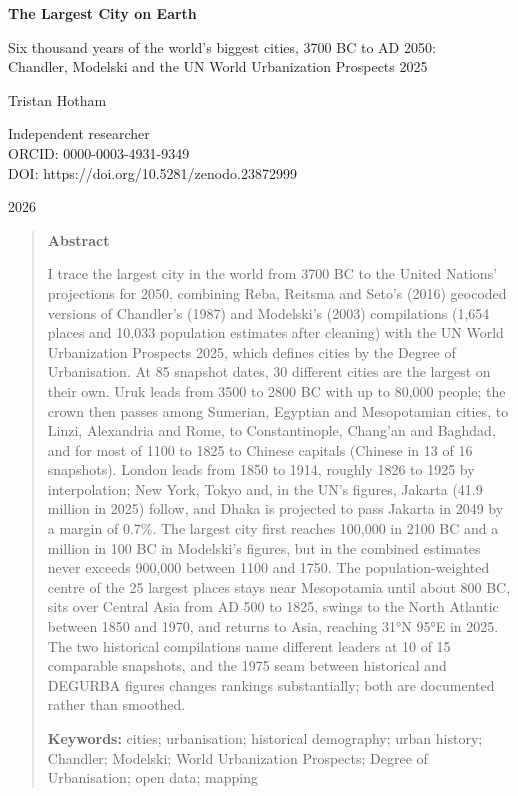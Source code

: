 \documentclass[11pt,a4paper]{article}
\begin{document}
\begin{center}
{\Large\bfseries The Largest City on Earth\par}
\vspace{0.4em}
{\large Six thousand years of the world's biggest cities, 3700 BC to AD 2050:\\Chandler, Modelski and the UN World Urbanization Prospects 2025\par}
\vspace{1.2em}
{\large Tristan Hotham\par}
\vspace{0.3em}
{\small Independent researcher\\
ORCID: 0000-0003-4931-9349\\
DOI: https://doi.org/10.5281/zenodo.23872999\par}
\vspace{0.8em}
2026
\end{center}

\begin{quote}
\small
\begin{center}\textbf{Abstract}\end{center}
I trace the largest city in the world from 3700 BC to the United Nations' projections for 2050, combining Reba, Reitsma and Seto's (2016) geocoded versions of Chandler's (1987) and Modelski's (2003) compilations (1,654 places and 10,033 population estimates after cleaning) with the UN World Urbanization Prospects 2025, which defines cities by the Degree of Urbanisation. At 85 snapshot dates, 30 different cities are the largest on their own. Uruk leads from 3500 to 2800 BC with up to 80,000 people; the crown then passes among Sumerian, Egyptian and Mesopotamian cities, to Linzi, Alexandria and Rome, to Constantinople, Chang'an and Baghdad, and for most of 1100 to 1825 to Chinese capitals (Chinese in 13 of 16 snapshots). London leads from 1850 to 1914, roughly 1826 to 1925 by interpolation; New York, Tokyo and, in the UN's figures, Jakarta (41.9 million in 2025) follow, and Dhaka is projected to pass Jakarta in 2049 by a margin of 0.7\%. The largest city first reaches 100,000 in 2100 BC and a million in 100 BC in Modelski's figures, but in the combined estimates never exceeds 900,000 between 1100 and 1750. The population-weighted centre of the 25 largest places stays near Mesopotamia until about 800 BC, sits over Central Asia from AD 500 to 1825, swings to the North Atlantic between 1850 and 1970, and returns to Asia, reaching 31°N 95°E in 2025. The two historical compilations name different leaders at 10 of 15 comparable snapshots, and the 1975 seam between historical and DEGURBA figures changes rankings substantially; both are documented rather than smoothed.

\textbf{Keywords:} cities; urbanisation; historical demography; urban history; Chandler; Modelski; World Urbanization Prospects; Degree of Urbanisation; open data; mapping
\end{quote}
\end{document}

